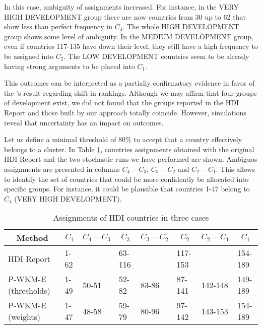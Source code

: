 \documentclass[]{elsarticle}
\theoremstyle{definition}
\begin{document}
In this case, ambiguity of assignments increased. For instance,  in  the VERY HIGH DEVELOPMENT group there are now countries from 30 up to 62 that show less than perfect frequency in $C_4$.  The whole HIGH DEVELOPMENT group shows some level of ambiguity. In the MEDIUM DEVELOPMENT group, even if  countries 117-135 have down their level, they still have a high frequency to be assigned into $C_2$. The LOW DEVELOPMENT countries seem to be already having strong arguments to be placed into $C_1$.

This outcomes can be interpreted as a partially confirmatory evidence in favor of the \cite{Garcia2010}'s result regarding shift in rankings.  Although we may affirm that four groups of development exist, we did not found that the groups reported in the HDI Report and those built by our approach totally coincide. However, simulations reveal that uncertainty has an impact on outcomes. 

Let us define a minimal threshold of 80\% to accept that a country effectively belongs to a cluster.  In Table \ref{compared}, countries assignments obtained  with the original HDI Report and the two stochastic runs we have performed are shown. Ambiguos assignments are presented in columns $C_4-C_3$, $C_3-C_2$ and $C_2-C_1$.  This allows to identify the set of countries that could be more confidently  be allocated into specific groups.  For instance, it could be plausible that countries 1-47  belong to $C_4$ (VERY HIGH DEVELOPMENT).  


\begin{table}[hbtp]
\caption{Assignments of HDI countries in three cases}
\label{compared}
\scriptsize
\begin{tabular}{llllllll}
\multicolumn{1}{c}{Method} 	& 
\multicolumn{1}{c}{$C_4$} 	& 
\multicolumn{1}{c}{$C_4-C_3$} & 
\multicolumn{1}{c}{$C_3$} 	& 
\multicolumn{1}{c}{$C_3-C_2$} & 
\multicolumn{1}{c}{$C_2$} 	& 
\multicolumn{1}{c}{$C_2-C_1$} & 
\multicolumn{1}{c}{$C_1$} 
\\\hline
HDI Report 			& 1-62	&		&63-116	&		&117-153	&			&154-189	\\
P-WKM-E (thresholds)	& 1-49	&50-51	&52-82	&83-86	&87-141	&142-148		&149-189	\\
P-WKM-E (weights)		& 1-47	&48-58	&59-79	&80-96	&97-142	&143-153		&154-189	\\\hline
\end{tabular}

\end{table}
\end{document}
